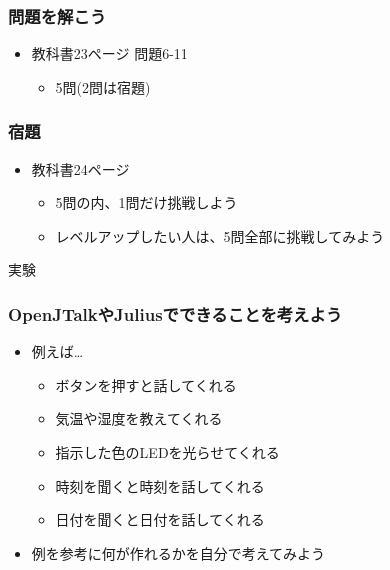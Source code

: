 \documentclass[14pt]{beamer}
\begin{document}
\begin{frame}
  \frametitle{問題を解こう}
  \begin{itemize}
    \item 教科書23ページ 問題6-11
          \begin{itemize}
            \item 5問(2問は宿題)
          \end{itemize}
  \end{itemize}
\end{frame}

\begin{frame}
  \frametitle{宿題}
  \begin{itemize}
    \item 教科書24ページ
          \begin{itemize}
            \item 5問の内、1問だけ挑戦しよう
            \item レベルアップしたい人は、5問全部に挑戦してみよう
          \end{itemize}
  \end{itemize}
\end{frame}

\begin{frame}
  \centering
  実験
\end{frame}

\begin{frame}
  \frametitle{OpenJTalkやJuliusでできることを考えよう}
  \begin{itemize}
    \item 例えば…
          \begin{itemize}
            \item ボタンを押すと話してくれる
            \item 気温や湿度を教えてくれる
            \item 指示した色のLEDを光らせてくれる
            \item 時刻を聞くと時刻を話してくれる
            \item 日付を聞くと日付を話してくれる
          \end{itemize}
    \item 例を参考に何が作れるかを自分で考えてみよう
  \end{itemize}
\end{frame}
\end{document}
